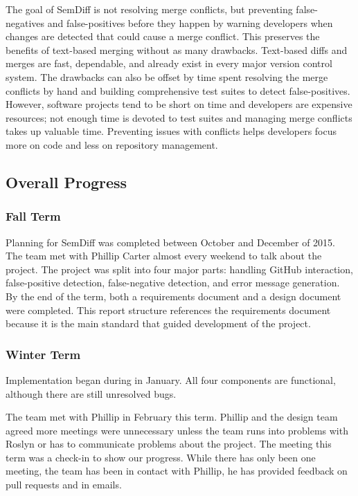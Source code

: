 \documentclass[draftclsnofoot,onecolumn]{IEEEtran}
\begin{document}
The goal of SemDiff is not resolving merge conflicts, but preventing 
false-negatives and false-positives before they happen by warning developers 
when changes are detected that could cause a merge conflict. This preserves the 
benefits of text-based merging without as many drawbacks. Text-based diffs 
and merges are fast, dependable, and already exist in every major version 
control system. The drawbacks can also be offset by time spent resolving the 
merge conflicts by hand and building comprehensive test suites to detect 
false-positives. However, software projects tend to be short on time and 
developers are expensive resources; not enough time is devoted to test suites 
and managing merge conflicts takes up valuable time. Preventing issues with 
conflicts helps developers focus more on code and less on repository management.

\subsection{Overall Progress}%

\subsubsection{Fall Term}

Planning for SemDiff was completed between October and December of 2015. The 
team met with Phillip Carter almost every weekend to talk about the project. 
The project was split into four major parts: handling GitHub interaction, 
false-positive detection, false-negative detection, and error message 
generation. By the end of the term, both a requirements document and a design 
document were completed. This report structure references the requirements 
document because it is the main standard that guided development of the project.

\subsubsection{Winter Term}

Implementation began during in January. All four components are functional, 
although there are still unresolved bugs. 

The team met with Phillip in February this term. Phillip and the design team 
agreed more meetings were unnecessary unless the team runs into problems with 
Roslyn or has to communicate problems about the project. The meeting this term 
was a check-in to show our progress. While there has only been one meeting, the 
team has been in contact with Phillip, he has provided feedback on pull requests 
and in emails.
\end{document}
